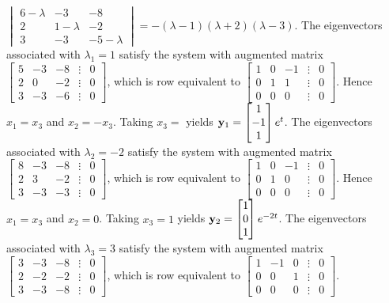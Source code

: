 \documentclass{ximera}
\begin{document}
\begin{problem}
\begin{solution}
    $ \begin{vmatrix}6-\lambda&-3&-8\\2&1-\lambda&-2\\
3&-3&-5-\lambda\end{vmatrix}=-(\lambda-1)(\lambda+2)(\lambda-3)$.
The eigenvectors associated
 with $\lambda_1=1$ satisfy the system with  augmented matrix
$  \begin{bmatrix}5&-3&-8&\vdots&0\\2&0
&-2&\vdots&0\\3&-3&-6&\vdots&0
 \end{bmatrix}$,
which is row equivalent to
$  \begin{bmatrix}1&0&-1&\vdots&0\\0&1&1&
\vdots&0\\0&0&0&\vdots&0 \end{bmatrix}$.
Hence  $x_1=x_3$ and $x_2=-x_3$.  Taking $x_3=$ yields
${\bf y}_1=  \begin{bmatrix}1\\-1\\1
 \end{bmatrix}e^t$.
The eigenvectors associated
 with $\lambda_2=-2$ satisfy the system with  augmented matrix
$  \begin{bmatrix}8&-3&-8&\vdots&0\\2&3
&-2&\vdots&0\\3&-3&-3&\vdots&0
 \end{bmatrix}$,
which is row equivalent to
$  \begin{bmatrix}1&0&-1&\vdots&0\\0&1&0&
\vdots&0\\0&0&0&\vdots&0 \end{bmatrix}$.
Hence $x_1=x_3$ and $x_2=0$.  Taking $x_3=1$ yields
${\bf y}_2=  \begin{bmatrix}1\\0\\1
 \end{bmatrix}e^{-2t}$.
The eigenvectors associated
 with $\lambda_3=3$ satisfy the system with  augmented matrix
$  \begin{bmatrix}3&-3&-8&\vdots&0\\2&-2
&-2&\vdots&0\\3&-3&-8&\vdots&0
 \end{bmatrix}$,
which is row equivalent to
$  \begin{bmatrix}1&-1&0&\vdots&0\\0&0&1&
\vdots&0\\0&0&0&\vdots&0 \end{bmatrix}$.

\end{solution}
\end{problem}
\end{document}
